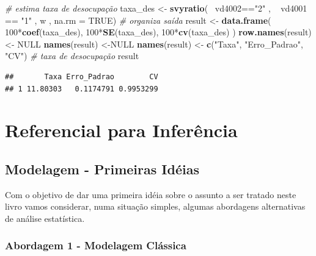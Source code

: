 \documentclass[]{book}
\newenvironment{Shaded}{\begin{snugshade}}{\end{snugshade}}
\newcommand{\KeywordTok}[1]{\textcolor[rgb]{0.13,0.29,0.53}{\textbf{{#1}}}}
\newcommand{\DataTypeTok}[1]{\textcolor[rgb]{0.13,0.29,0.53}{{#1}}}
\newcommand{\DecValTok}[1]{\textcolor[rgb]{0.00,0.00,0.81}{{#1}}}
\newcommand{\StringTok}[1]{\textcolor[rgb]{0.31,0.60,0.02}{{#1}}}
\newcommand{\CommentTok}[1]{\textcolor[rgb]{0.56,0.35,0.01}{\textit{{#1}}}}
\newcommand{\OtherTok}[1]{\textcolor[rgb]{0.56,0.35,0.01}{{#1}}}
\newcommand{\NormalTok}[1]{{#1}}
\numberwithin{example}{chapter}
\numberwithin{remark}{chapter}
\numberwithin{definition}{chapter}
\begin{document}
\begin{Shaded}
\begin{Highlighting}[]
\CommentTok{# estima taxa de desocupação}
\NormalTok{taxa_des <-}\StringTok{ }\KeywordTok{svyratio}\NormalTok{(~}\StringTok{ }\NormalTok{vd4002==}\StringTok{"2"} \NormalTok{,}
  \NormalTok{~}\StringTok{ }\NormalTok{vd4001 ==}\StringTok{ "1"} \NormalTok{, w , }\DataTypeTok{na.rm =} \OtherTok{TRUE}\NormalTok{)}
\CommentTok{# organiza saída}
\NormalTok{result <-}\StringTok{ }\KeywordTok{data.frame}\NormalTok{(}
  \DecValTok{100}\NormalTok{*}\KeywordTok{coef}\NormalTok{(taxa_des),}
  \DecValTok{100}\NormalTok{*}\KeywordTok{SE}\NormalTok{(taxa_des), }
  \DecValTok{100}\NormalTok{*}\KeywordTok{cv}\NormalTok{(taxa_des)}
\NormalTok{)}
\KeywordTok{row.names}\NormalTok{(result)<-}\StringTok{ }\OtherTok{NULL}
\KeywordTok{names}\NormalTok{(result) <-}\OtherTok{NULL}
\KeywordTok{names}\NormalTok{(result) <-}\StringTok{ }\KeywordTok{c}\NormalTok{(}\StringTok{"Taxa"}\NormalTok{, }\StringTok{"Erro_Padrao"}\NormalTok{, }\StringTok{"CV"}\NormalTok{)}
\CommentTok{# taxa de desocupação}
\NormalTok{result}
\end{Highlighting}
\end{Shaded}

\begin{verbatim}
##       Taxa Erro_Padrao        CV
## 1 11.80303   0.1174791 0.9953299
\end{verbatim}

\chapter{Referencial para Inferência}\label{refinf}

\section{Modelagem - Primeiras Idéias}\label{classic}

Com o objetivo de dar uma primeira idéia sobre o assunto a ser tratado
neste livro vamos considerar, numa situação simples, algumas abordagens
alternativas de análise estatística.

\subsection{Abordagem 1 - Modelagem
Clássica}\label{abordagem-1---modelagem-classica}
\end{document}
